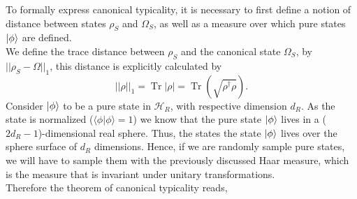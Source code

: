 \indent To formally express canonical typicality, it is necessary to first define a notion of distance between states $\rho_S$ and $\Omega_S$, as well as a measure over which pure states $\mathinner{|{\phi}\rangle}$ are defined.\\
\indent We define the trace distance between $\rho_S$ and the canonical state $\Omega_S$, by  $||\rho_S-\Omega||_1$, this distance is explicitly calculated by
\begin{equation}
||\rho||_1=\operatorname{Tr}|\rho|=\operatorname{Tr}\left(\sqrt{\rho^{\dagger} \rho}\right).
\label{CH1:Trace_distance}
\end{equation}
Consider $\mathinner{|{\phi}\rangle}$ to be a pure state in $\mathcal{H}_R$, with respective dimension $d_R$. As the state is normalized ($\langle\phi | \phi\rangle=1$) we know that the pure state $\mathinner{|{\phi}\rangle}$ lives in a ($2d_R-1$)-dimensional real sphere. Thus, the states the state $\mathinner{|{\phi}\rangle}$ lives over the sphere surface of $d_R$ dimensions. Hence, if we are randomly sample pure states, we will have to sample them with the previously discussed Haar measure, which is the measure that is invariant under unitary transformations.\\
Therefore the theorem of canonical typicality reads,

